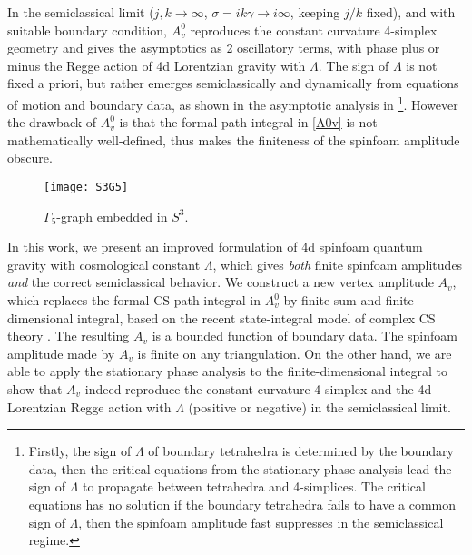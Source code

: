 \documentclass[aps,prd,notitlepage,nofootinbib,superscriptaddress,groupedaddress,twocolumn]{revtex4-1}
\newcommand{\g}{\gamma}
\newcommand{\G}{\Gamma}
\newcommand{\sig}{\sigma}
\renewcommand{\L }{\Lambda}
\begin{document}
In the semiclassical limit ($j,k\to\infty$, $\sig=ik\g\to i\infty$, keeping $j/k$ fixed), and with suitable boundary condition, $A^0_v$ reproduces the constant curvature 4-simplex geometry and gives the asymptotics as 2 oscillatory terms, with phase plus or minus the Regge action of 4d Lorentzian gravity with $\L$. The sign of $\L$ is not fixed a priori, but rather emerges semiclassically and dynamically from equations of motion and boundary data, as shown in the asymptotic analysis in \cite{HHKR}\footnote{ Firstly, the sign of $\L$ of boundary tetrahedra is determined by the boundary data, then the critical equations from the stationary phase analysis lead the sign of $\L$ to propagate between tetrahedra and 4-simplices. The critical equations has no solution if the boundary tetrahedra fails to have a common sign of $\L$, then the spinfoam amplitude fast suppresses in the semiclassical regime.}. However the drawback of $A^0_v$ is that the formal path integral in \eqref{A0v} is not mathematically well-defined, thus makes the finiteness of the spinfoam amplitude obscure.  


\begin{figure}[h]
	\begin{center}
	\texttt{[image: S3G5]}
	\caption{$\G_5$-graph embedded in $S^3$.}
	\label{S3G5}
	\end{center}
\end{figure}


In this work, we present an improved formulation of 4d spinfoam quantum gravity with cosmological constant $\L$, which gives \emph{both} finite spinfoam amplitudes \emph{and} the correct semiclassical behavior. We construct a new vertex amplitude $A_v$, which replaces the formal CS path integral in $A^0_v$ by finite sum and finite-dimensional integral, based on the recent state-integral model of complex CS theory \cite{Dimofte2011,levelk,Andersen2014}. The resulting $A_v$ is a bounded function of boundary data. The spinfoam amplitude made by $A_v$ is finite on any triangulation. On the other hand, we are able to apply the stationary phase analysis to the finite-dimensional integral to show that $A_v$ indeed reproduce the constant curvature 4-simplex and the 4d Lorentzian Regge action with $\L$ (positive or negative) in the semiclassical limit. 
\end{document}
